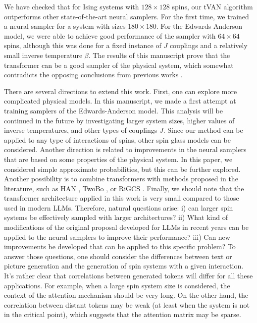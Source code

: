\documentclass[3p, times,merge]{elsarticle}
\begin{document}
We have checked that for Ising systems with $128\times 128$ spins, our tVAN algorithm outperforms other state-of-the-art neural samplers. For the first time, we trained a neural sampler for a system with sizes $180\times 180$. For the Edwards-Anderson model, we were able to achieve good performance of the sampler with $64\times 64$ spins, although this was done for a fixed instance of $J$ couplings and a relatively small inverse temperature $\beta$. The results of this manuscript prove that the transformer can be a good sampler of the physical system, which somewhat contradicts the opposing conclusions from previous works \cite{ Abbott:2023thq,PhysRevE.111.025304,Singha:2025lsd}.

There are several directions to extend this work. First, one can explore more complicated physical models. In this manuscript, we made a first attempt at training samplers of the Edwards-Anderson model. This analysis will be continued in the future by investigating larger system sizes, higher values of inverse temperatures, and other types of couplings $J$. Since our method can be applied to any type of interactions of spins, other spin glass models can be considered. Another direction is related to improvements in the neural samplers that are based on some properties of the physical system. In this paper, we considered simple approximate probabilities, but this can be further explored. Another possibility is to combine transformers with methods proposed in the literature, such as HAN \cite{Bialas:2022qbs}, TwoBo \cite{Biazzo_2023,2024MLS&T...5b5074B}, or RiGCS \cite{Singha:2025lsd}. Finally, we should note that the transformer architecture applied in this work is very small compared to those used in modern LLMs. Therefore, natural questions arise: i) can larger spin systems be effectively sampled with larger architectures? ii) What kind of modifications of the  original proposal \cite{NIPS2017_3f5ee243} developed for LLMs in recent years can be applied to the neural samplers to improve their performance? iii) Can new improvements be developed that can be applied to this specific problem? To answer those questions, one should consider the differences between text or picture generation and the generation of spin systems with a given interaction. It's rather clear that correlations between generated tokens will differ for all these applications. For example, when a large spin system size is considered, the context of the attention mechanism should be very long. On the other hand, the correlation between distant tokens may be weak (at least when the system is not in the critical point), which suggests that the attention matrix may be sparse.    
\end{document}
